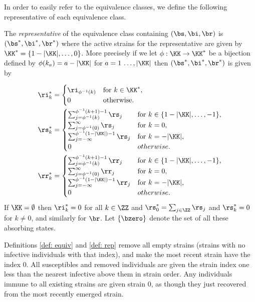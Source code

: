 \documentclass[smallextended]{svjour3}       %
\begin{document}
In order to easily refer to the equivalence classes, we define the following representative of each equivalence class.
\begin{mydef}\label{def: rep}
	The \emph{representative} of the equivalence class containing $(\bs, \bi, \br)$ is $(\bs^*, \bi^*, \br^*)$ where the active strains for the representative are given by $\KK^* = \{ 1 - |\KK|, \dots, 0 \}$. More precisely if we let $\phi: \KK \rightarrow \KK^*$ be a bijection defined by $\phi(k_a) = a - |\KK|$ for $a = 1\, \dots, |\KK|$ then $(\bs^*, \bi^*, \br^*)$ is given by

\begin{align*}
		\ri^*_k &= \begin{cases}
						\ri_{\phi^{-1}(k)} & \text{for } k \in \KK^*, \\
						0 & \text{otherwise.}
					\end{cases}\\
		\rs^*_k &= \begin{cases} 
\sum_{j = \phi^{-1}(k)}^{\phi^{-1}(k+1) - 1} \rs_j &\text{for } k\in \{ 1-|\KK|,\dots, - 1 \},\\
\sum_{j = \phi^{-1}(0)}^\infty \rs_j &\text{for } k = 0,\\
\sum_{j = -\infty}^{\phi^{-1}(1 - |\KK|) - 1} \rs_j &\text{for } k=-|\KK|,\\
0 & otherwise.  
\end{cases} \\
\rr^*_k &= \begin{cases} 
\sum_{j = \phi^{-1}(k)}^{\phi^{-1}(k+1) - 1} \rr_j &\text{for } k\in \{ 1-|\KK|,\dots, - 1 \},\\
\sum_{j = \phi^{-1}(0)}^\infty \rr_j &\text{for } k = 0,\\
\sum_{j = -\infty}^{\phi^{-1}(1 - |\KK|) - 1} \rr_j &\text{for } k=-|\KK|,\\
0 & otherwise.  
\end{cases}
\end{align*}
If $\KK = \emptyset$ then $\ri^*_k = 0$ for all $k \in \ZZ$ and $\rs^*_0 = \sum_{j \in \ZZ} \rs_j$ and $\rs^*_k = 0$ for $k \neq 0$, and similarly for $\br$. Let $\{\bzero\}$ denote the set of all these absorbing states.
\end{mydef}
Definitions \ref{def: equiv} and \ref{def: rep} remove all empty strains (strains with no infective individuals with that index), and make the most recent strain have the index $0$. All susceptibles and removed individuals are given the strain index one less than the nearest infective above them in strain order. Any individuals immune to all existing strains are given strain $0$, as though they just recovered from the most recently emerged strain.
\end{document}
